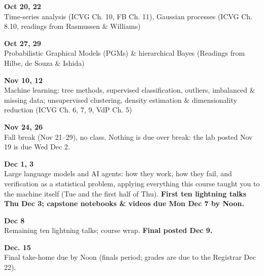 \begin{innerlist}
\item[] \smallskip

\item {\bf\headerfont\color{RoyalBlue} Oct 20, 22}\\ Time-series analysis (ICVG Ch. 10, FB Ch. 11), Gaussian processes (ICVG Ch. 8.10, readings from Rasmussen \& Williams)\smallskip

\item {\bf\headerfont\color{RoyalBlue} Oct 27, 29}\\ Probabilistic Graphical Models (PGMs) \& hierarchical Bayes (Readings from Hilbe, de Souza \& Ishida)\smallskip

\item[] \smallskip

\item {\bf\headerfont\color{RoyalBlue} Nov 10, 12}\\ Machine learning: tree methods, supervised classification, outliers, imbalanced \& missing data; unsupervised clustering, density estimation \& dimensionality reduction (ICVG Ch. 6, 7, 9, VdP Ch. 5)\smallskip

\item[] \smallskip

\item {\bf\headerfont\color{RoyalBlue} Nov 24, 26}\\ {\color{Red} Fall break (Nov 21--29), no class.} Nothing is due over break: the lab posted Nov 19 is due Wed Dec 2.\smallskip

\item {\bf\headerfont\color{RoyalBlue} Dec 1, 3}\\ Large language models and AI agents: how they work, how they fail, and verification as a statistical problem, applying everything this course taught you to the machine itself (Tue and the first half of Thu). {\bf First ten lightning talks Thu Dec 3; capstone notebooks \& videos due Mon Dec 7 by Noon.}\smallskip

\item {\bf\headerfont\color{RoyalBlue} Dec 8}\\ Remaining ten lightning talks; course wrap. {\bf Final posted Dec 9.}\smallskip

\item {\bf\headerfont\color{Red} Dec. 15\nth}\\ Final take-home due by Noon (finals period; grades are due to the Registrar Dec 22).\smallskip
\end{innerlist}
\smallskip
